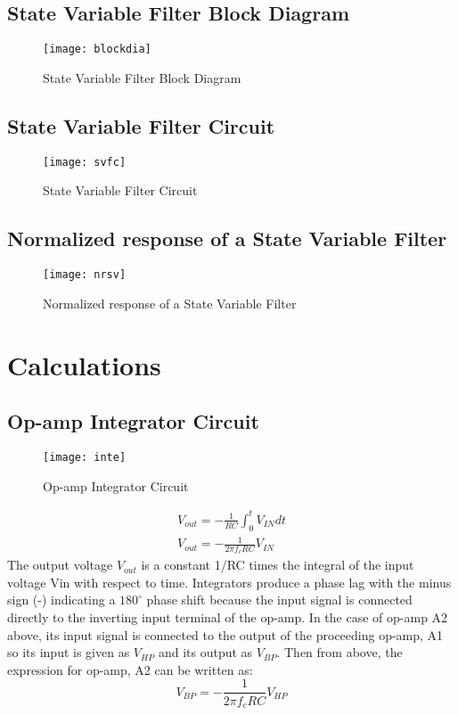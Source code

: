 \documentclass[
	letterpaper, %
	10pt, %
]{CSUniSchoolLabReport}
\begin{document}
\subsection{State Variable Filter Block Diagram}
\begin{figure}[H] %
	\centering %
	\texttt{[image: blockdia]} %
	\caption{State Variable Filter Block Diagram}
\end{figure}
\subsection{State Variable Filter Circuit}
\begin{figure}[H] %
	\centering %
	\texttt{[image: svfc]} %
	\caption{State Variable Filter Circuit}
\end{figure}
\subsection{Normalized response of a State Variable Filter}
\begin{figure}[H] %
	\centering %
	\texttt{[image: nrsv]} %
	\caption{Normalized response of a State Variable Filter}
\end{figure}
\section{Calculations}
\subsection{Op-amp Integrator Circuit}
\begin{figure}[H] %
	\centering %
	\texttt{[image: inte]} %
	\caption{Op-amp Integrator Circuit}
\end{figure}
\begin{gather}
	V_{out} = -\frac{1}{RC}\int_{0}^{t} V_{IN}dt \\
	V_{out} = -\frac{1}{2 \pi f_c RC} V_{IN} 
\end{gather}
The output voltage $V_{out}$ is a constant 1/RC times the integral of the input voltage Vin with respect to time. Integrators produce a phase lag with the minus sign (-) indicating a $180^\circ{}$ phase shift because the input signal is connected directly to the inverting input terminal of the op-amp.
In the case of op-amp A2 above, its input signal is connected to the output of the proceeding op-amp, A1 so its input is given as $V_{HP}$ and its output as $V_{BP}$. Then from above, the expression for op-amp, A2 can be written as:
\begin{equation}
	V_{BP} = -\frac{1}{2 \pi f_c RC}V_{HP}  
\end{equation}
\end{document}
